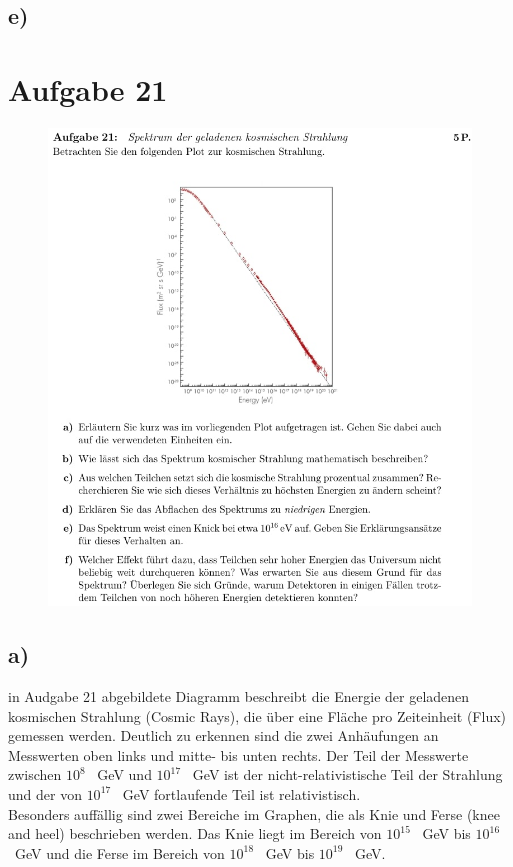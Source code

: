 \subsection{e)}

\section{Aufgabe 21}

    \begin{figure}[H]
        \centering
        \includegraphics[width=\textwidth]{images/Aufgabe21.jpg}
        \label{fig:4}
    \end{figure}


\subsection{a)}

    \justifying in Audgabe 21 abgebildete Diagramm beschreibt die Energie der geladenen kosmischen Strahlung (Cosmic Rays), die über eine Fläche pro Zeiteinheit (Flux)
    gemessen werden. Deutlich zu erkennen sind die zwei Anhäufungen an Messwerten oben links und mitte- bis unten rechts. Der Teil der Messwerte zwischen $10^{8}$ \SI{}{\giga\electronvolt}
    und $10^{17}$ \SI{}{\giga\electronvolt} ist der nicht-relativistische Teil der Strahlung und der von $10^{17}$ \SI{}{\giga\electronvolt} fortlaufende Teil ist relativistisch.\\
    Besonders auffällig sind zwei Bereiche im Graphen, die als Knie und Ferse (knee and heel) beschrieben werden. Das Knie liegt im Bereich von $10^{15}$ \SI{}{\giga\electronvolt}
    bis $10^{16}$ \SI{}{\giga\electronvolt} und die Ferse im Bereich von $10^{18}$ \SI{}{\giga\electronvolt} bis $10^{19}$ \SI{}{\giga\electronvolt}.

